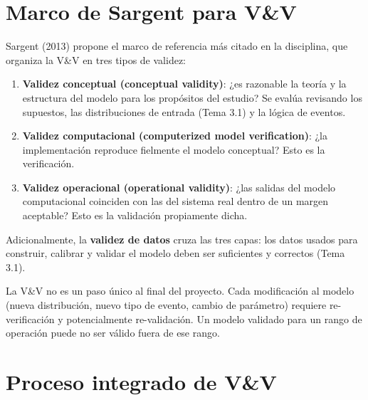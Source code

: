 \documentclass[11pt, letterpaper]{article}
\begin{document}
\section{Marco de Sargent para V\&V}

Sargent (2013) propone el marco de referencia más citado en la disciplina, que organiza la V\&V en tres tipos de validez:

\begin{enumerate}
    \item \textbf{Validez conceptual (conceptual validity)}: ¿es razonable la teoría y la estructura del modelo para los propósitos del estudio? Se evalúa revisando los supuestos, las distribuciones de entrada (Tema 3.1) y la lógica de eventos.
    \item \textbf{Validez computacional (computerized model verification)}: ¿la implementación reproduce fielmente el modelo conceptual? Esto es la verificación.
    \item \textbf{Validez operacional (operational validity)}: ¿las salidas del modelo computacional coinciden con las del sistema real dentro de un margen aceptable? Esto es la validación propiamente dicha.
\end{enumerate}

Adicionalmente, la \textbf{validez de datos} cruza las tres capas: los datos usados para construir, calibrar y validar el modelo deben ser suficientes y correctos (Tema 3.1).

\begin{notabox}
La V\&V no es un paso único al final del proyecto. Cada modificación al modelo (nueva distribución, nuevo tipo de evento, cambio de parámetro) requiere re-verificación y potencialmente re-validación. Un modelo validado para un rango de operación puede no ser válido fuera de ese rango.
\end{notabox}

\section{Proceso integrado de V\&V}
\end{document}
